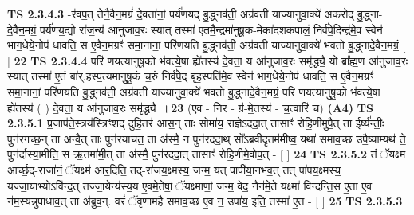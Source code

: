 \documentclass[17pt]{extarticle}
\begin{document}
                                \textbf{ TS 2.3.4.3} \newline
                  -र॑वप॒त् तेनै॒वैन॒मग्रं॑ दे॒वता॑नां॒ पर्य॑णयद् बु॒द्ध्नव॑ती॒ अग्र॑वती याज्यानुवा॒क्ये॑ अकरोद् बु॒द्ध्ना-दे॒वैन॒मग्रं॒ पर्य॑णय॒द्यो रा॑ज॒न्य॑ आनुजाव॒रः स्यात् तस्मा॑ ए॒तमै॒न्द्रमा॑नुषू॒क-मेका॑दशकपालं॒ निर्व॑पे॒दिन्द्र॑मे॒व स्वेन॑ भाग॒धेये॒नोप॑ धावति॒ स ए॒वैन॒मग्रꣳ॑ समा॒नानां॒ परि॑णयति बु॒द्ध्नव॑ती॒ अग्र॑वती याज्यानुवा॒क्ये॑ भवतो बु॒द्ध्नादे॒वैन॒मग्रं॒ [  ] \textbf{  22} \newline
                  \newline
                                \textbf{ TS 2.3.4.4} \newline
                  परि॑ णयत्यानुषू॒को भ॑वत्ये॒षा ह्ये॑तस्य॑ दे॒वता॒ य आ॑नुजाव॒रः समृ॑द्ध्यै॒ यो ब्रा᳚ह्म॒ण आ॑नुजाव॒रः स्यात् तस्मा॑ ए॒तं बा॑र्.हस्प॒त्यमा॑नुषू॒कं च॒रुं निर्व॑पे॒द् बृह॒स्पति॑मे॒व स्वेन॑ भाग॒धेये॒नोप॑ धावति॒ स ए॒वैन॒मग्रꣳ॑ समा॒नानां॒ परि॑णयति बु॒द्ध्नव॑ती॒ अग्र॑वती याज्यानुवा॒क्ये॑ भवतो बु॒द्ध्नादे॒वैन॒मग्रं॒ परि॑ णयत्यानुषू॒को भ॑वत्ये॒षा ह्ये॑तस्य॑ ( ) दे॒वता॒ य आ॑नुजाव॒रः समृ॑द्ध्यै ॥ \textbf{  23} \newline
                  \newline
                      (ए॒व - निर - ग्र॑-मे॒तस्य॑ - च॒त्वारि॑ च)  \textbf{(A4)} \newline \newline
                                        \textbf{ TS 2.3.5.1} \newline
                  प्र॒जाप॑ते॒स्त्रय॑स्त्रिꣳशद् दुहि॒तर॑ आस॒न् ताः सोमा॑य॒ राज्ञे॑ऽददा॒त् तासाꣳ॑ रोहि॒णीमुपै॒त् ता ईर्ष्य॑न्तीः॒ पुन॑रगच्छ॒न् ता अन्वै॒त् ताः पुन॑रयाचत॒ ता अ॑स्मै॒ न पुन॑रददा॒थ् सो᳚ऽब्रवीदृ॒तम॑मीष्व॒ यथा॑ समाव॒च्छ उ॑पै॒ष्याम्यथ॑ ते॒ पुन॑र्दास्या॒मीति॒ स ऋ॒तमा॑मी॒त् ता अ॑स्मै॒ पुन॑रददा॒त् तासाꣳ॑ रोहि॒णीमे॒वोप॒त् - [  ] \textbf{  24} \newline
                  \newline
                                \textbf{ TS 2.3.5.2} \newline
                  तं ॅयक्ष्म॑ आर्च्छ॒द्-राजा॑नं॒ ॅयक्ष्म॑ आर॒दिति॒ तद्-रा॑जय॒क्ष्मस्य॒ जन्म॒ यत् पापी॑या॒नभ॑व॒त् तत् पा॑पय॒क्ष्मस्य॒ यज्जा॒याभ्योऽवि॑न्द॒त् तज्जा॒येन्य॑स्य॒य ए॒वमे॒तेषां॒ ॅयक्ष्मा॑णां॒ जन्म॒ वेद॒ नैन॑मे॒ते यक्ष्मा॑ विन्दन्ति॒स ए॒ता ए॒व न॑म॒स्यन्नुपा॑धाव॒त् ता अ॑ब्रुव॒न्. वरं॑ ॅवृणामहै समाव॒च्छ ए॒व न॒ उपा॑य॒ इति॒ तस्मा॑ ए॒त - [  ] \textbf{  25} \newline
                  \newline
                                \textbf{ TS 2.3.5.3} \newline
\end{document}
